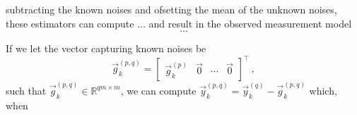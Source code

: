 \documentclass[conference]{IEEEtran}
\begin{document}
\begin{LaTeXdescription}
  subtracting the known noises and ofsetting the mean of the unknown noises, these estimators can compute $\dots$ and result in the observed measurement model
  \begin{equation}
    \dots
  \end{equation}
  


  If we let the vector capturing known noises be
  \begin{equation}
    \vec{g}_k^{(p,q)}=
    \begin{bmatrix}
      \vec{g}_k^{(p)} & \vec{0} & \cdots & \vec{0}
    \end{bmatrix}^\top\,,
  \end{equation}
  such that $\vec{g}_k^{(p,q)} \in \mathbb{R}^{qm \times m}$, we can compute $\vec{y}_k^{(p,q)}=\vec{y}_k^{(q)}-\vec{g}_k^{(p,q)}$ which, when
\end{LaTeXdescription}
\end{document}
